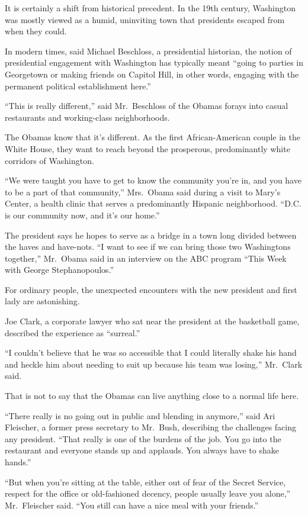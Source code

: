 \documentclass[12pt,a4paper,onecolumn]{article}
\begin{document}
\begin{CJK*}{GBK}{song}
It is certainly a shift from historical precedent. In the 19th century, Washington was mostly viewed
as a humid, uninviting town that presidents escaped from when they could.

In modern times, said Michael Beschloss, a presidential historian, the notion of presidential
engagement with Washington has typically meant ``going to parties in Georgetown or making friends on
Capitol Hill, in other words, engaging with the permanent political establishment here.''

``This is really different,'' said Mr.~Beschloss of the Obamas forays into casual restaurants and
working-class neighborhoods.

The Obamas know that it's different. As the first African-American couple in the White House, they
want to reach beyond the prosperous, predominantly white corridors of Washington.

``We were taught you have to get to know the community you're in, and you have to be a part of that
community,'' Mrs.~Obama said during a visit to Mary's Center, a health clinic that serves a
predominantly Hispanic neighborhood. ``D.C. is our community now, and it's our home.''

The president says he hopes to serve as a bridge in a town long divided between the haves and
have-nots. ``I want to see if we can bring those two Washingtons together,'' Mr.~Obama said in an
interview on the ABC program ``This Week with George Stephanopoulos.''

For ordinary people, the unexpected encounters with the new president and first lady are
astonishing.

Joe Clark, a corporate lawyer who sat near the president at the basketball game, described the
experience as ``surreal.''

``I couldn't believe that he was so accessible that I could literally shake his hand and heckle him
about needing to suit up because his team was losing,'' Mr.~Clark said.

That is not to say that the Obamas can live anything close to a normal life here.

``There really is no going out in public and blending in anymore,'' said Ari Fleischer, a former
press secretary to Mr.~Bush, describing the challenges facing any president. ``That really is one of
the burdens of the job. You go into the restaurant and everyone stands up and applauds. You always
have to shake hands.''

``But when you're sitting at the table, either out of fear of the Secret Service, respect for the
office or old-fashioned decency, people usually leave you alone,'' Mr.~Fleischer said. ``You still
can have a nice meal with your friends.''


\end{CJK*}
\end{document}
